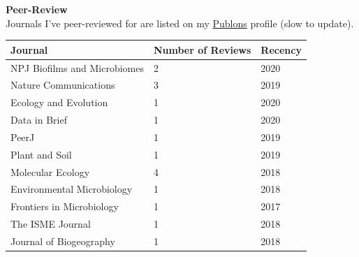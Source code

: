 \documentclass{article}
\begin{document}
\vspace{3mm}
\pagebreak
{\large  \textbf{Peer-Review}}\\
Journals I've peer-reviewed for are listed on my \href{https://publons.com/researcher/1262170/john-l-darcy/peer-review/}{Publons} profile (slow to update). 
\\\begin{tabular}{l l l}
  Journal & Number of Reviews & Recency\\
  \hline
  NPJ Biofilms and Microbiomes & 2 & 2020\\
  Nature Communications & 3 & 2019\\
  Ecology and Evolution & 1 & 2020\\
  Data in Brief & 1 & 2020\\
  PeerJ & 1 & 2019\\
  Plant and Soil & 1 & 2019\\
  Molecular Ecology & 4 & 2018\\
  Environmental Microbiology & 1 & 2018\\
  Frontiers in Microbiology & 1 & 2017\\
  The ISME Journal & 1 & 2018\\
  Journal of Biogeography & 1 & 2018\\
\end{tabular}
\vspace{3mm}
\end{document}
